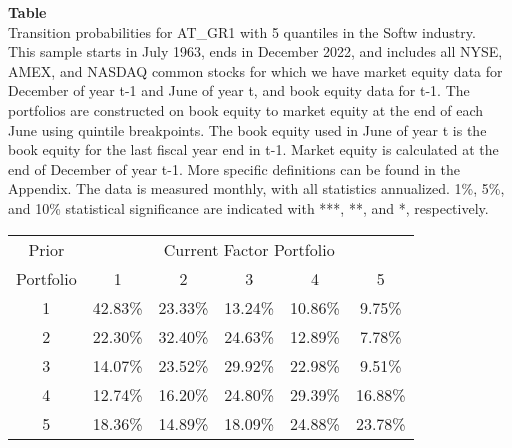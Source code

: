 \begin{table*}[ht!]
\raggedright
{}
\label{tab: transition_probs_AT_GR1_Softw_with_5_quantiles}
\textbf{Table \thetable} \\
Transition probabilities for AT_GR1 with 5 quantiles in the Softw industry. \\
\hspace*{1em}This sample starts in July 1963, ends in December 2022, and includes all NYSE, AMEX, and NASDAQ common stocks for which we have market equity data for December of year t-1 and June of year t, and book equity data for t-1. The portfolios are constructed on book equity to market equity at the end of each June using quintile breakpoints.  The book equity used in June of year t is the book equity for the last fiscal year end in t-1.  Market equity is calculated at the end of December of year t-1.  More specific definitions can be found in the Appendix.  The data is measured monthly, with all statistics annualized.  1\%, 5\%, and 10\% statistical significance are indicated with ***, **, and *, respectively. \\
\vspace{0.5em}
\centering
\begin{adjustbox}{max width=\textwidth}
\begin{tabular}{@{}cccccc@{}}
\toprule
Prior & \multicolumn{5}{c}{Current Factor Portfolio} \\
Portfolio & 1 & 2 & 3 & 4 & 5 \\
\midrule
1 & 42.83\% & 23.33\% & 13.24\% & 10.86\% & 9.75\% \\
2 & 22.30\% & 32.40\% & 24.63\% & 12.89\% & 7.78\% \\
3 & 14.07\% & 23.52\% & 29.92\% & 22.98\% & 9.51\% \\
4 & 12.74\% & 16.20\% & 24.80\% & 29.39\% & 16.88\% \\
5 & 18.36\% & 14.89\% & 18.09\% & 24.88\% & 23.78\% \\
\bottomrule
\end{tabular}
\end{adjustbox}
\end{table*}